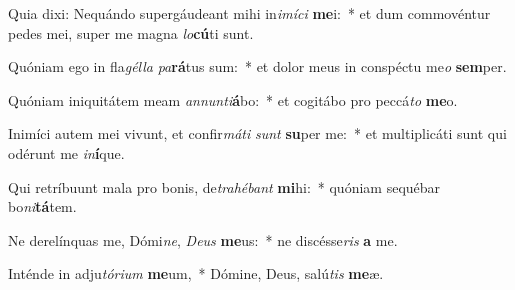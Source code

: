 \item Quia dixi: Nequándo supergáudeant mihi in\textit{i}\textit{mí}\textit{ci} \textbf{me}i:~* et dum commovéntur pedes mei, super me magna \textit{lo}\textbf{cú}ti sunt.
\item Quóniam ego in fla\textit{gél}\textit{la} \textit{pa}\textbf{rá}tus sum:~* et dolor meus in conspéctu me\textit{o} \textbf{sem}per.
\item Quóniam iniquitátem meam \textit{an}\textit{nun}\textit{ti}\textbf{á}bo:~* et cogitábo pro peccá\textit{to} \textbf{me}o.
\item Inimíci autem mei vivunt, et confir\textit{má}\textit{ti} \textit{sunt} \textbf{su}per me:~* et multiplicáti sunt qui odérunt me \textit{in}\textbf{í}que.
\item Qui retríbuunt mala pro bonis, de\textit{tra}\textit{hé}\textit{bant} \textbf{mi}hi:~* quóniam sequébar bo\textit{ni}\textbf{tá}tem.
\item Ne derelínquas me, Dómi\textit{ne}, \textit{De}\textit{us} \textbf{me}us:~* ne discésse\textit{ris} \textbf{a} me.
\item Inténde in adju\textit{tó}\textit{ri}\textit{um} \textbf{me}um,~* Dómine, Deus, salú\textit{tis} \textbf{me}æ.
